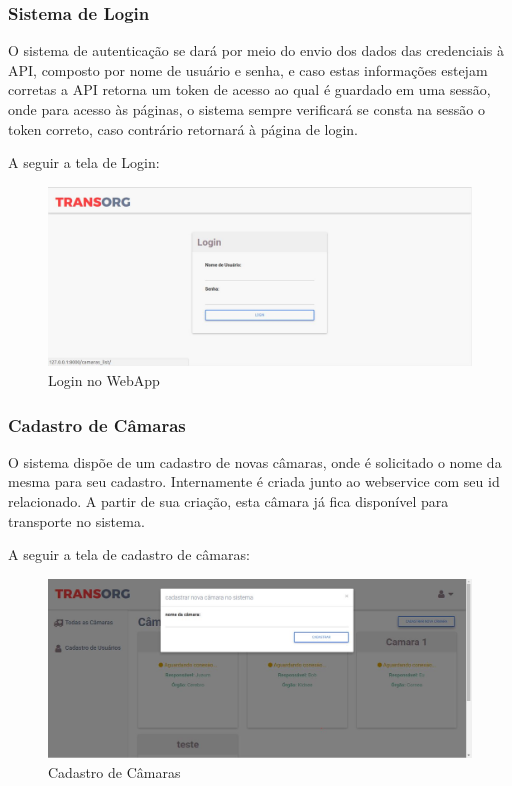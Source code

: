 \subsubsection{Sistema de Login}
	O sistema de autenticação se dará por meio do envio dos dados das credenciais à API, composto por nome de usuário e senha, e caso estas informações estejam corretas a API retorna um token de acesso ao qual é guardado em uma sessão, onde para acesso às páginas, o sistema sempre verificará se consta na sessão o token correto, caso contrário retornará à página de login. 
	
	A seguir a tela de Login:

\begin{figure}[H]
\centering
\includegraphics[width=16cm]{figuras/login_software.JPG}
\caption{Login no WebApp}
\end{figure}

\subsubsection{Cadastro de Câmaras}
	O sistema dispõe de um cadastro de novas câmaras, onde é solicitado o nome da mesma para seu cadastro. Internamente é criada junto ao webservice com seu id relacionado. A partir de sua criação, esta câmara já fica disponível para transporte no sistema.
	
	A seguir a tela de cadastro de câmaras:

\begin{figure}[H]
\centering
\includegraphics[width=16cm]{figuras/cadastroCamaras_software.JPG}
\caption{Cadastro de Câmaras}
\end{figure}

